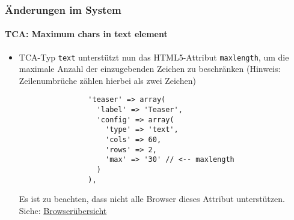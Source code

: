 %

\begin{frame}[fragile]
	\frametitle{Änderungen im System}
	\framesubtitle{TCA: Maximum chars in text element}

	\begin{itemize}
		\item TCA-Typ \texttt{text} unterstützt nun das HTML5-Attribut \texttt{maxlength},
			um die maximale Anzahl der einzugebenden Zeichen zu beschränken
			\small(Hinweis: Zeilenumbrüche zählen hierbei als zwei Zeichen)\normalsize

			\begin{lstlisting}
				'teaser' => array(
				  'label' => 'Teaser',
				  'config' => array(
				    'type' => 'text',
				    'cols' => 60,
				    'rows' => 2,
				    'max' => '30' // <-- maxlength
				  )
				),
			\end{lstlisting}

			\small
				Es ist zu beachten, dass nicht alle Browser dieses Attribut unterstützen.\newline
				Siehe: \href{http://www.w3schools.com/tags/att_textarea_maxlength.asp}{Browserübersicht}
			\normalsize

	\end{itemize}

\end{frame}


